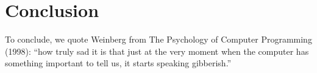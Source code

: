 \newcommand{\discussionSection}{Conclusion}
\section{\protect\discussionSection} %
\label{sec:discussion}
To conclude, we quote Weinberg from The Psychology of Computer Programming (1998): ``how truly sad it is that just at the very moment
when the computer has something important to tell us, it starts
speaking gibberish.''

\begin{comment}
\newcommand{\acksSection}{Acknowledgments}
\section*{\protect\acksSection} 
\label{sec:acks}

The authors would like to thank Brigitte Pientka, Jonathan Aldrich, Joshua Sunshine, Michael Hilton, Claire LeGoues,
the participants of the PL reading group at UChicago,
and the referees and participants of the LIVE 2017 and Off the Beaten Track (OBT)
2017 workshops for their insights and feedback on various iterations of this work.
%
This material was supported by a gift from
Facebook, from the National Science Foundation under grant
number CCF-1619282, and from AFRL and DARPA under agreement \#FA8750-16-2-0042. 
%
Any opinions, findings, and conclusions or recommendations expressed
in this material are those of the authors and do not necessarily
reflect the views of Facebook, NSF, DARPA or AFRL.
%
\end{comment}

\clearpage








